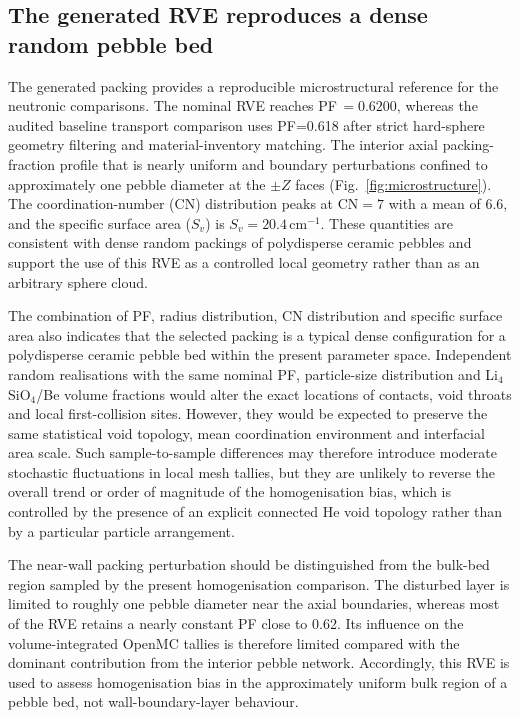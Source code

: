 \documentclass[preprint,12pt]{elsarticle}
\begin{document}
\subsection{The generated RVE reproduces a dense random pebble bed}

The generated packing provides a reproducible microstructural reference for the
neutronic comparisons.  The nominal RVE reaches PF\,$=0.6200$, whereas the
audited baseline transport comparison uses PF=0.618 after strict hard-sphere
geometry filtering and material-inventory matching.  The interior axial
packing-fraction profile that is nearly uniform and boundary perturbations
confined to approximately one pebble diameter at the $\pm Z$ faces
(Fig.~\ref{fig:microstructure}).  The coordination-number (CN) distribution peaks at
CN$=7$ with a mean of 6.6, and the specific surface area ($S_v$) is
$S_v=20.4$\,cm$^{-1}$.  These quantities are consistent with dense random
packings of polydisperse ceramic pebbles and support the use of this RVE as a
controlled local geometry rather than as an arbitrary sphere cloud.

The combination of PF, radius distribution, CN distribution and specific
surface area also indicates that the selected packing is a typical dense
configuration for a polydisperse ceramic pebble bed within the present parameter
space.  Independent random realisations with the same nominal PF, particle-size
distribution and Li$_4$SiO$_4$/Be volume fractions would alter the exact
locations of contacts, void throats and local first-collision sites.  However,
they would be expected to preserve the same statistical void topology, mean
coordination environment and interfacial area scale.  Such sample-to-sample
differences may therefore introduce moderate stochastic fluctuations in local
mesh tallies, but they are unlikely to reverse the overall trend or order of
magnitude of the homogenisation bias, which is controlled by the presence of an
explicit connected He void topology rather than by a particular particle
arrangement.

The near-wall packing perturbation should be distinguished from the bulk-bed
region sampled by the present homogenisation comparison.  The disturbed layer is
limited to roughly one pebble diameter near the axial boundaries, whereas most
of the RVE retains a nearly constant PF close to 0.62.  Its influence on the
volume-integrated OpenMC tallies is therefore limited compared with the
dominant contribution from the interior pebble network.  Accordingly, this RVE
is used to assess homogenisation bias in the approximately uniform bulk region
of a pebble bed, not wall-boundary-layer behaviour.
\end{document}
